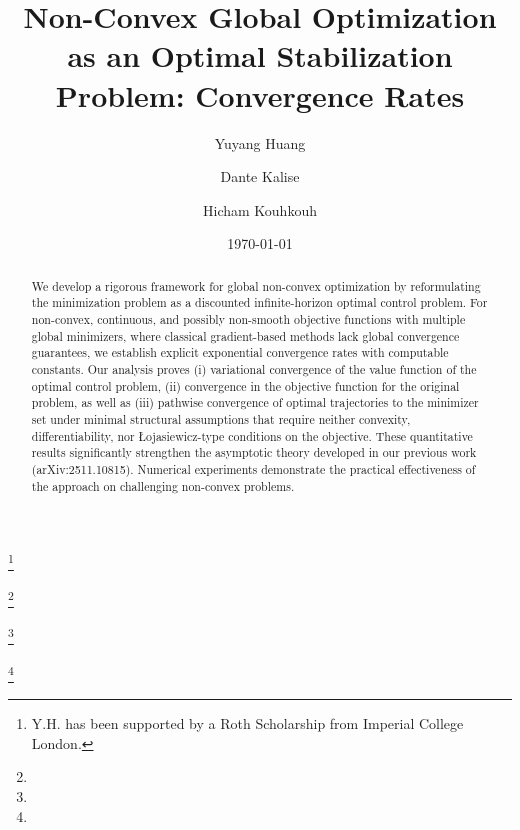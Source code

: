 \documentclass[12pt]{amsart}
\numberwithin{equation}{section}
\theoremstyle{plain}
\begin{document}
\title[Non-Convex Global Optimization as Optimal Stabilization]{Non-Convex Global Optimization as an Optimal Stabilization Problem: Convergence Rates}
\thanks{Y.H. has been supported by a Roth Scholarship from Imperial College London.
}


\author{Yuyang Huang}
\address{Yuyang Huang \newline 
Department of Mathematics, Imperial College London, South Kensington Campus SW72AZ London, UK
}
\thanks{ 
}

\author{Dante Kalise}
\address{Dante Kalise \newline 
Department of Mathematics, Imperial College London, South Kensington Campus SW72AZ London, UK
}
\thanks{
}

\author{Hicham Kouhkouh}
\address{Hicham Kouhkouh \newline %
Department of Mathematics and Scientific Computing, NAWI, University of Graz, %
Heinrichstra{\ss}e 36, 8010, Graz, Austria
}
\thanks{}


\date{\today}


\begin{abstract}
We develop a rigorous framework for global non-convex optimization by reformulating the minimization problem as a discounted infinite-horizon optimal control problem. For non-convex, continuous, and  possibly non-smooth objective functions with multiple global minimizers, where classical gradient-based methods lack global convergence guarantees, we establish explicit exponential convergence rates with computable constants.  
Our analysis proves (i) variational convergence of the value function of the optimal control problem, (ii) convergence in the objective function for the original problem, as well as (iii) pathwise convergence of optimal trajectories to the minimizer set under minimal structural assumptions that require neither convexity, differentiability, nor \L{}ojasiewicz-type conditions on the objective.  These quantitative results significantly strengthen the asymptotic theory developed in our previous work  
(arXiv:2511.10815). %
Numerical experiments demonstrate the practical effectiveness of the approach on challenging non-convex problems.
\end{abstract}

\end{document}
